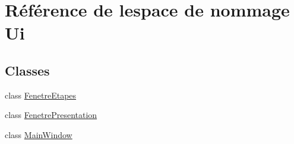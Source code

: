 \hypertarget{namespace_ui}{}\section{Référence de l\textquotesingle{}espace de nommage Ui}
\label{namespace_ui}
\subsection*{Classes}
\begin{DoxyCompactItemize}
\item 
class \hyperlink{class_ui_1_1_fenetre_etapes}{Fenetre\+Etapes}
\item 
class \hyperlink{class_ui_1_1_fenetre_presentation}{Fenetre\+Presentation}
\item 
class \hyperlink{class_ui_1_1_main_window}{Main\+Window}
\end{DoxyCompactItemize}
